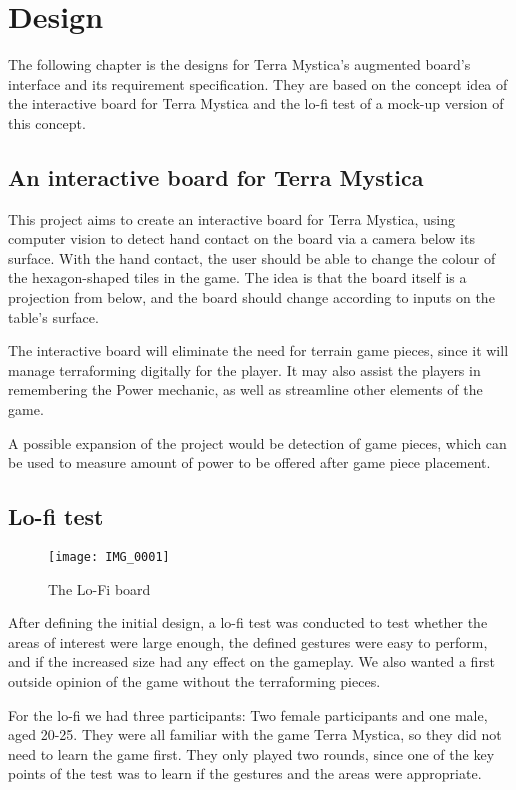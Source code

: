 \chapter{Design}\label{ch:design}
The following chapter is the designs for Terra Mystica's augmented board's interface and its requirement specification. They are based on the concept idea of the interactive board for Terra Mystica and the lo-fi test of a mock-up version of this concept.

\section{An interactive board for Terra Mystica}
This project aims to create an interactive board for Terra Mystica, using computer vision to detect hand contact on the board via a camera below its surface. With the hand contact, the user should be able to change the colour of the hexagon-shaped tiles in the game. The idea is that the board itself is a projection from below, and the board should change according to inputs on the table's surface.

The interactive board will eliminate the need for terrain game pieces, since it will manage terraforming digitally for the player. It may also assist the players in remembering the Power mechanic, as well as streamline other elements of the game.

A possible expansion of the project would be detection of game pieces, which can be used to measure amount of power to be offered after game piece placement.

\section{Lo-fi test}
\begin{figure}
\centering
\texttt{[image: IMG\_0001]}
\caption{The Lo-Fi board}
\end{figure}

After defining the initial design, a lo-fi test was conducted to test whether the areas of interest were large enough, the defined gestures were easy to perform, and if the increased size had any effect on the gameplay. We also wanted a first outside opinion of the game without the terraforming pieces. 

For the lo-fi we had three participants: Two female participants and one male, aged 20-25. 
They were all familiar with the game Terra Mystica, so they did not need to learn the game first. They only played two rounds, since one of the key points of the test was to learn if the gestures and the areas were appropriate. 

